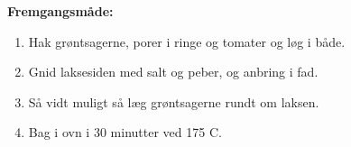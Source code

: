 \documentclass{book}
\begin{document}
\begin{minipage}[t] {0.5\textwidth}
\textbf{Fremgangsmåde:}
\begin{enumerate}
    \item Hak grøntsagerne, porer i ringe og tomater og løg i både.
    \item Gnid laksesiden med salt og peber, og anbring i fad.
    \item Så vidt muligt så læg grøntsagerne rundt om laksen.
    \item Bag i ovn i 30 minutter ved 175 \degree C.
\end{enumerate}
\end{minipage}
\newpage 
{}
\end{document}

